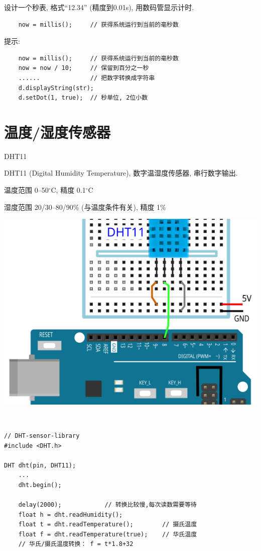 \documentclass[a4paper,11pt]{seminar}
\begin{document}
设计一个秒表, 格式``12.34'' (精度到0.01s), 用数码管显示计时.
\begin{lstlisting}
    now = millis();     // 获得系统运行到当前的毫秒数
\end{lstlisting}
\pause
提示:
\begin{lstlisting}
    now = millis();     // 获得系统运行到当前的毫秒数
    now = now / 10;     // 保留到百分之一秒
    ......              // 把数字转换成字符串
    d.displayString(str);
    d.setDot(1, true);  // 秒单位, 2位小数
\end{lstlisting}
\endslide

\chapter{温度/湿度传感器}{DHT11}

DHT11 (Digital Humidity Temperature), 数字温湿度传感器,
串行数字输出.

温度范围 0--50$^\circ$C, 精度 0.1$^\circ$C

湿度范围 20/30--80/90\% (与温度条件有关), 精度 1\% 
\endslide


\centering
\includegraphics[width=.8\textwidth]{temperature}
\endslide

~\ \vskip-6mm
\begin{lstlisting}
// DHT-sensor-library
#include <DHT.h>

DHT dht(pin, DHT11);
    ...
    dht.begin();

    delay(2000);            // 转换比较慢,每次读数需要等待
    float h = dht.readHumidity();
    float t = dht.readTemperature();        // 摄氏温度
    float f = dht.readTemperature(true);    // 华氏温度
    // 华氏/摄氏温度转换： f = t*1.8+32
\end{lstlisting}
\endslide
\end{document}
